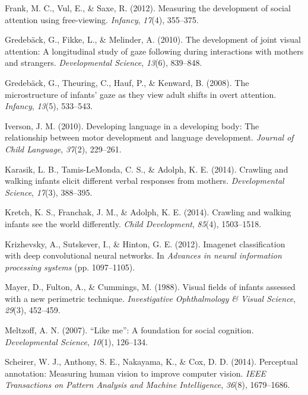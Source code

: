 \documentclass[10pt, letterpaper]{article}
\begin{document}
\hypertarget{ref-frank2012measuring}{}
Frank, M. C., Vul, E., \& Saxe, R. (2012). Measuring the development of
social attention using free-viewing. \emph{Infancy}, \emph{17}(4),
355--375.

\hypertarget{ref-gredeback2010development}{}
Gredebäck, G., Fikke, L., \& Melinder, A. (2010). The development of
joint visual attention: A longitudinal study of gaze following during
interactions with mothers and strangers. \emph{Developmental Science},
\emph{13}(6), 839--848.

\hypertarget{ref-gredeback2008microstructure}{}
Gredebäck, G., Theuring, C., Hauf, P., \& Kenward, B. (2008). The
microstructure of infants' gaze as they view adult shifts in overt
attention. \emph{Infancy}, \emph{13}(5), 533--543.

\hypertarget{ref-iverson2010}{}
Iverson, J. M. (2010). Developing language in a developing body: The
relationship between motor development and language development.
\emph{Journal of Child Language}, \emph{37}(2), 229--261.

\hypertarget{ref-karasik2014}{}
Karasik, L. B., Tamis-LeMonda, C. S., \& Adolph, K. E. (2014). Crawling
and walking infants elicit different verbal responses from mothers.
\emph{Developmental Science}, \emph{17}(3), 388--395.

\hypertarget{ref-kretch2014}{}
Kretch, K. S., Franchak, J. M., \& Adolph, K. E. (2014). Crawling and
walking infants see the world differently. \emph{Child Development},
\emph{85}(4), 1503--1518.

\hypertarget{ref-krizhevsky2012imagenet}{}
Krizhevsky, A., Sutskever, I., \& Hinton, G. E. (2012). Imagenet
classification with deep convolutional neural networks. In
\emph{Advances in neural information processing systems} (pp.
1097--1105).

\hypertarget{ref-mayer1988}{}
Mayer, D., Fulton, A., \& Cummings, M. (1988). Visual fields of infants
assessed with a new perimetric technique. \emph{Investigative
Ophthalmology \& Visual Science}, \emph{29}(3), 452--459.

\hypertarget{ref-meltzoff2007like}{}
Meltzoff, A. N. (2007). ``Like me'': A foundation for social cognition.
\emph{Developmental Science}, \emph{10}(1), 126--134.

\hypertarget{ref-scheirer2014perceptual}{}
Scheirer, W. J., Anthony, S. E., Nakayama, K., \& Cox, D. D. (2014).
Perceptual annotation: Measuring human vision to improve computer
vision. \emph{IEEE Transactions on Pattern Analysis and Machine
Intelligence}, \emph{36}(8), 1679--1686.
\end{document}
